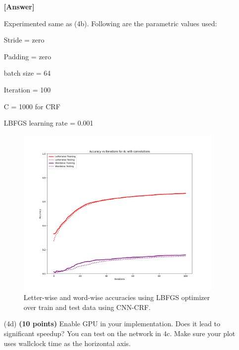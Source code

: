 \documentclass[11pt]{report}
\begin{document}
\begin{itemize}
\item[\textbf{[Answer]} ]{
Experimented same as (4b). Following are the parametric values used:

Stride = zero

Padding = zero 

batch size = 64

Iteration = 100

C = 1000 for CRF

LBFGS learning rate = 0.001

   \begin{figure}[H]
            	\centering
            	\includegraphics[width=10cm]{latex/accuracies_4c.png}
                \caption{Letter-wise and word-wise accuracies using LBFGS optimizer over train and test data using CNN-CRF. }
            	\label{fig:compare_optimizer}
            \end{figure}
          }
 
 
 


\item [(4d)] {\bf (10 points)} Enable GPU in your implementation. Does it lead
  to significant speedup? You can test on the network in 4c. Make sure your plot
  uses wallclock time as the horizontal axis.
  

\end{itemize}
\end{document}
